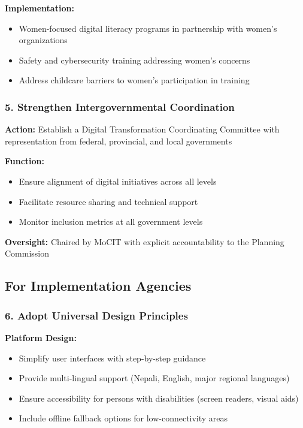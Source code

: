\documentclass[12pt,a4paper]{article}
\begin{document}
\textbf{Implementation:}
\begin{itemize}
    \item Women-focused digital literacy programs in partnership with women's organizations
    \item Safety and cybersecurity training addressing women's concerns
    \item Address childcare barriers to women's participation in training
\end{itemize}

\subsubsection{5. Strengthen Intergovernmental Coordination}

\textbf{Action:} Establish a Digital Transformation Coordinating Committee with representation from federal, provincial, and local governments

\textbf{Function:}
\begin{itemize}
    \item Ensure alignment of digital initiatives across all levels
    \item Facilitate resource sharing and technical support
    \item Monitor inclusion metrics at all government levels
\end{itemize}

\textbf{Oversight:} Chaired by MoCIT with explicit accountability to the Planning Commission

\subsection{For Implementation Agencies}

\subsubsection{6. Adopt Universal Design Principles}

\textbf{Platform Design:}
\begin{itemize}
    \item Simplify user interfaces with step-by-step guidance
    \item Provide multi-lingual support (Nepali, English, major regional languages)
    \item Ensure accessibility for persons with disabilities (screen readers, visual aids)
    \item Include offline fallback options for low-connectivity areas
\end{itemize}
\end{document}

